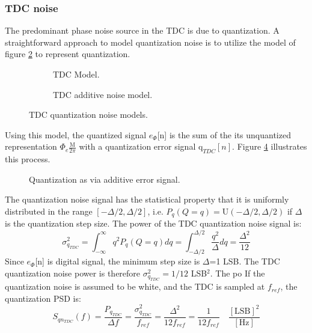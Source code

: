 	\subsubsection{TDC noise}\label{tdc_noise}
		The predominant phase noise source in the TDC is due to quantization. A straightforward approach to model quantization noise is to utilize the model of figure \ref{fig:tdc_add_pn} to represent quantization.
		\begin{figure}[htb!]
		    \centering
		    \begin{subfigure}{0.5\textwidth}
		        \centering
		        
		        \caption{TDC Model.}
		        \label{fig:tdc1}
		    \end{subfigure}%
		    \begin{subfigure}{0.5\textwidth}
		        \centering
		        
		        \caption{TDC additive noise model.}
		        \label{fig:tdc_add_pn}
		    \end{subfigure}
		    \label{fig:tdc_pn_model}
		    \caption{TDC quantization noise models.}
		\end{figure}
		\FloatBarrier
		Using this model, the quantized signal $e_\Phi$[n] is the sum of the its unquantized representation $\Phi_e\frac{\mathrm{M}}{2\pi}$ with a quantization error signal $\mathrm{q}_{TDC}[n]$. Figure \ref{fig:quantization} illustrates this process.
		\begin{figure}[htb!]
			\center
			\caption{Quantization as via additive error signal.}
			\label{fig:quantization}
		\end{figure}
		\FloatBarrier
		The quantization noise signal has the statistical property that it is uniformly distributed in the range $[-\Delta/2, \Delta/2]$, i.e. $P_q(Q=q) =\mathrm{U}(-\Delta/2, \Delta/2)$ if $\Delta$ is the quantization step size. The power of the TDC quantization noise signal is:
		\begin{equation}\label{eq:tdc_noise}
			\sigma_{q_{TDC}}^2 = \int_{-\infty}^\infty q^2P_q(Q=q)dq =  \int_{-\Delta/2}^{\Delta/2}\frac{q^2}{\Delta}dq = \frac{\Delta^2}{12}
		\end{equation}
		Since $e_\Phi$[n] is digital signal, the minimum step size is $\Delta$=1 LSB. The TDC quantization noise power is therefore $\sigma_{q_{TDC}}^2 = 1/12$ LSB$^2$. The po
		If the quantization noise is assumed to be white, and the TDC is sampled at $f_{ref}$, the quantization PSD is:
		\begin{equation}
			S_{qn_{TDC}}(f) = \frac{P_{q_{TDC}}}{\Delta f} = \frac{\sigma_{q_{TDC}}^2}{f_{ref}} = \frac{\Delta^2}{12f_{ref}} = \frac{1}{12f_{ref}} \hspace{1em}\frac{[\text{LSB}]^2}{[\text{Hz}]}
		\end{equation}

